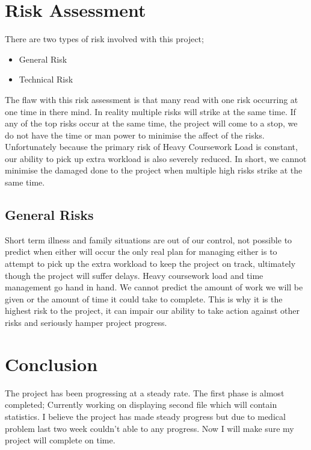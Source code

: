 \documentclass{report}
\begin{document}
\section{Risk Assessment}
\label{sec:rskas}

There are two types of risk involved with this project;
\begin{itemize}
\item General Risk
\item Technical Risk
\end{itemize}
The flaw with this risk assessment is that many read with one risk occurring at one time in there mind. In reality multiple risks will strike at the same time. If any of the top  risks occur at the same time, the project will come to a stop, we do not have the time or man power to minimise the affect of the risks. Unfortunately because the primary risk of Heavy Coursework Load is constant, our ability to pick up extra workload is also severely reduced. In short, we cannot minimise the damaged done to the project when multiple high risks strike at the same time.

\subsection{General Risks}
\label{sec:gr}
Short term illness and family situations are out of our control, not possible to predict when either will occur the only real plan for managing either  is to attempt to pick up the extra workload to keep the project on track, ultimately though the project will suffer delays. Heavy coursework load and time management go hand in hand. We cannot predict the amount of work we will be given or the amount of time it could take to complete. This is why it is the highest risk to the project, it can impair our ability to take action against other risks and seriously hamper project progress. 

\section{Conclusion}
\label{sec:con}

The project has been progressing at a steady rate. The first phase is almost completed; Currently working on displaying second file which will contain statistics. I believe the project has made steady progress but due to medical problem last two week couldn't able to any progress. Now I will make sure my project will complete on time. 






\end{document}
